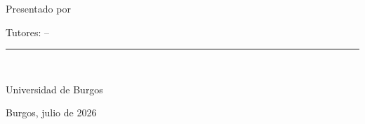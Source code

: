 {  \begin{center}
      {\Large Presentado por \@author\par}
      \vspace{0.30cm}
      {\large Tutores: \@tutor{} -- \@tutorb{}\par}
    \end{center}

    \vfill

    \begin{center}
      \rule{0.55\textwidth}{0.4pt}\\[0.25cm]
      {\large Universidad de Burgos\par}
      \vspace{0.15cm}
      {\large Burgos, julio de 2026\par}
    \end{center}

    \clearpage
}


\renewcommand{\appendixname}{Apéndice}
\renewcommand*\cftappendixname{\appendixname\ }
